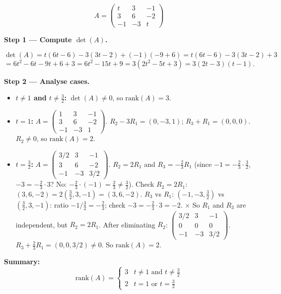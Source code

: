 \documentclass[12pt,a3paper]{article}
\begin{document}
\begin{tcolorbox}[enhanced,breakable,colback=cC!4,colframe=cC,
  boxrule=0.8pt,arc=5pt,
  title={\textbf{Answer}},
  fonttitle=\bfseries\color{white},colbacktitle=cC]

\[
A=\begin{pmatrix}t&3&-1\\3&6&-2\\-1&-3&t\end{pmatrix}
\]

\textbf{Step 1 --- Compute $\det(A)$.}

\[
\det(A)=t(6t-6)-3(3t-2)+(-1)(-9+6)
= t(6t-6)-3(3t-2)+3
\]
\[
=6t^2-6t-9t+6+3 = 6t^2-15t+9 = 3(2t^2-5t+3)=3(2t-3)(t-1).
\]

\textbf{Step 2 --- Analyse cases.}

\begin{itemize}[itemsep=4pt]
  \item \textbf{$t\neq 1$ and $t\neq\tfrac{3}{2}$:} $\det(A)\neq 0$, so $\mathrm{rank}(A)=3$.

  \item \textbf{$t=1$:} $A=\begin{pmatrix}1&3&-1\\3&6&-2\\-1&-3&1\end{pmatrix}$.
  $R_2-3R_1=(0,-3,1)$; $R_3+R_1=(0,0,0)$.
  $R_2\neq 0$, so $\mathrm{rank}(A)=2$.

  \item \textbf{$t=\tfrac{3}{2}$:} $A=\begin{pmatrix}3/2&3&-1\\3&6&-2\\-1&-3&3/2\end{pmatrix}$.
  $R_2=2R_1$ and $R_3=-\tfrac{2}{3}R_1$ (since $-1=-\tfrac{2}{3}\cdot\tfrac{3}{2}$, $-3=-\tfrac{2}{3}\cdot 3$? No: $-\tfrac{2}{3}\cdot(-1)=\tfrac{2}{3}\neq\tfrac{3}{2}$).
  Check $R_2=2R_1$: $(3,6,-2)=2(\tfrac{3}{2},3,-1)=(3,6,-2)$. \checkmark
  $R_3$ vs $R_1$: $(-1,-3,\tfrac{3}{2})$ vs $(\tfrac{3}{2},3,-1)$: ratio $-1/\tfrac{3}{2}=-\tfrac{2}{3}$; check $-3=-\tfrac{2}{3}\cdot 3=-2$. $\times$
  So $R_1$ and $R_3$ are independent, but $R_2=2R_1$.
  After eliminating $R_2$: $\begin{pmatrix}3/2&3&-1\\0&0&0\\-1&-3&3/2\end{pmatrix}$.
  $R_3+\tfrac{2}{3}R_1=(0,0,3/2)\neq 0$. So $\mathrm{rank}(A)=2$.
\end{itemize}

\textbf{Summary:}
\[
\mathrm{rank}(A)=\begin{cases}3 & t\neq 1\text{ and }t\neq\tfrac{3}{2}\\2 & t=1\text{ or }t=\tfrac{3}{2}\end{cases}
\]
\end{tcolorbox}
\end{document}
